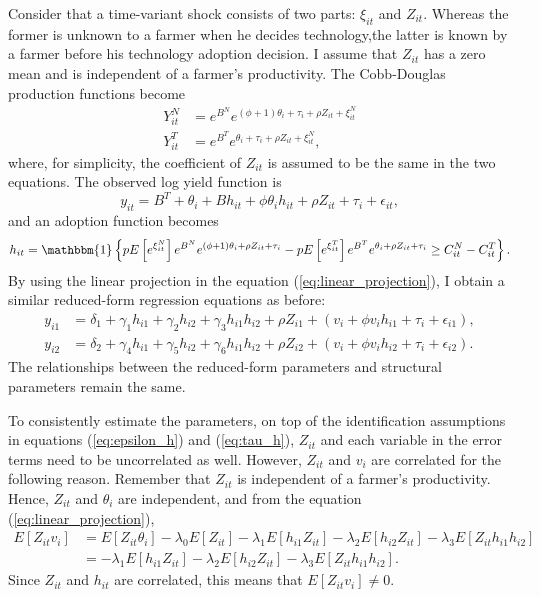 \documentclass[11pt,letterpaper]{article}
\begin{document}
Consider that a time-variant shock consists of two parts: $\xi_{it}$ and $Z_{it}$.
Whereas the former is unknown to a farmer when he decides technology,the latter is known by a farmer before his technology adoption decision.
I assume that $Z_{it}$ has a zero mean and is independent of a farmer's productivity.
The Cobb-Douglas production functions become
\begin{align*}
  Y_{it}^N &= e^{B^N} e^{(\phi + 1) \theta_i + \tau_i + \rho Z_{it} + \xi_{it}^N} \\
  Y_{it}^T &= e^{B^T} e^{\theta_i + \tau_i + \rho Z_{it} + \xi_{it}^N},
\end{align*}
where, for simplicity, the coefficient of $Z_{it}$ is assumed to be the same in the two equations.
The observed log yield function is
\begin{equation*}
  y_{it} = B^T + \theta_i + B h_{it} + \phi \theta_i h_{it} + \rho Z_{it} + \tau_i + \epsilon_{it},
\end{equation*}
and an adoption function becomes
\begin{equation}\label{eq:adoption}
  h_{it} = \mathbbm{1}\left\{p E\left[e^{\xi_{it}^N} \right] e^{B^N} e^{(\phi + 1) \theta_i + \rho Z_{it} + \tau_i} - p E\left[e^{\xi_{it}^T} \right] e^{B^T} e^{\theta_i + \rho Z_{it} + \tau_i} \ge C_{it}^N - C_{it}^T\right\}.
\end{equation}
By using the linear projection in the equation (\ref{eq:linear_projection}), I obtain a similar reduced-form regression equations as before:
\begin{align*}
  y_{i1} &= \delta_1 + \gamma_1 h_{i1} + \gamma_2 h_{i2} + \gamma_3 h_{i1} h_{i2} + \rho Z_{i1} + (v_i + \phi v_i h_{i1} + \tau_i + \epsilon_{i1}), \\
  y_{i2} &= \delta_2 + \gamma_4 h_{i1} + \gamma_5 h_{i2} + \gamma_6 h_{i1} h_{i2} + \rho Z_{i2} + (v_i + \phi v_i h_{i2} + \tau_i + \epsilon_{i2}).
\end{align*}
The relationships between the reduced-form parameters and structural parameters remain the same.

To consistently estimate the parameters, on top of the identification assumptions in equations (\ref{eq:epsilon_h}) and (\ref{eq:tau_h}), $Z_{it}$ and each variable in the error terms need to be uncorrelated as well.
However, $Z_{it}$ and $v_i$ are correlated for the following reason.
Remember that $Z_{it}$ is independent of a farmer's productivity.
Hence, $Z_{it}$ and $\theta_i$ are independent, and from the equation (\ref{eq:linear_projection}), 
\begin{align*}
  E[Z_{it} v_i] 
  &= E[Z_{it} \theta_i] - \lambda_0 E[Z_{it}] - \lambda_1 E[h_{i1} Z_{it}] - \lambda_2 E[h_{i2} Z_{it}] - \lambda_3 E[Z_{it} h_{i1} h_{i2}] \\
  &=  - \lambda_1 E[h_{i1} Z_{it}] - \lambda_2 E[h_{i2} Z_{it}] - \lambda_3 E[Z_{it} h_{i1} h_{i2}].
\end{align*}
Since $Z_{it}$ and $h_{it}$ are correlated, this means that $E[Z_{it} v_i] \ne 0$.
\end{document}
